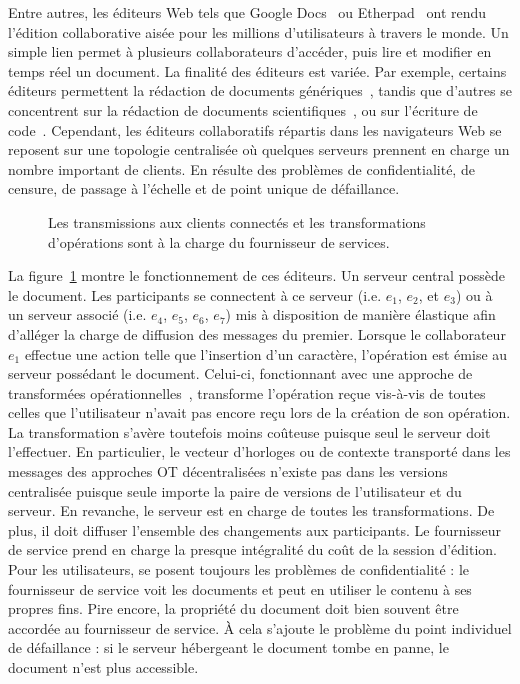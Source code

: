 Entre autres, les éditeurs Web tels que Google Docs~\cite{googledocs} ou
Etherpad~\cite{etherpad} ont rendu l'édition collaborative aisée pour les
millions d'utilisateurs à travers le monde. Un simple lien permet à plusieurs
collaborateurs d'accéder, puis lire et modifier en temps réel un document. La
finalité des éditeurs est variée. Par exemple, certains éditeurs permettent la
rédaction de documents génériques~\cite{etherpad, googledocs, googlewave,
  hivejs}, tandis que d'autres se concentrent sur la rédaction de documents
scientifiques~\cite{authorea, overleaf, sharelatex, fidus}, ou sur l'écriture de
code~\cite{lautamaki2012cored, hyperdev}.  Cependant, les éditeurs collaboratifs
répartis dans les navigateurs Web se reposent sur une topologie centralisée où
quelques serveurs prennent en charge un nombre important de clients. En résulte
des problèmes de confidentialité, de censure, de passage à l'échelle et de point
unique de défaillance.



\begin{figure}
  \begin{center}
    
    \caption[Fonctionnement des éditeurs centralisés]
    {\label{editor:fig:serviceprovider} Les transmissions aux clients connectés
      et les transformations d'opérations sont à la charge du fournisseur de
      services.}
  \end{center}
\end{figure}

La figure~\ref{editor:fig:serviceprovider} montre le fonctionnement de ces
éditeurs. Un serveur central possède le document. Les participants se connectent
à ce serveur (i.e. $e_1$, $e_2$, et $e_3$) ou à un serveur associé (i.e. $e_4$,
$e_5$, $e_6$, $e_7$) mis à disposition de manière élastique afin d'alléger la
charge de diffusion des messages du premier. Lorsque le collaborateur $e_1$
effectue une action telle que l'insertion d'un caractère, l'opération est émise
au serveur possédant le document. Celui-ci, fonctionnant avec une approche de
transformées opérationnelles~\cite{nichols1995high}, transforme l'opération
reçue vis-à-vis de toutes celles que l'utilisateur n'avait pas encore reçu lors
de la création de son opération. La transformation s'avère toutefois moins
coûteuse puisque seul le serveur doit l'effectuer. En particulier, le vecteur
d'horloges ou de contexte transporté dans les messages des approches OT
décentralisées n'existe pas dans les versions centralisée puisque seule importe
la paire de versions de l'utilisateur et du serveur. En revanche, le serveur est
en charge de toutes les transformations. De plus, il doit diffuser l'ensemble
des changements aux participants. Le fournisseur de service prend en charge la
presque intégralité du coût de la session d'édition. Pour les utilisateurs, se
posent toujours les problèmes de confidentialité : le fournisseur de service
voit les documents et peut en utiliser le contenu à ses propres fins. Pire
encore, la propriété du document doit bien souvent être accordée au fournisseur
de service. À cela s'ajoute le problème du point individuel de défaillance : si
le serveur hébergeant le document tombe en panne, le document n'est plus
accessible.

